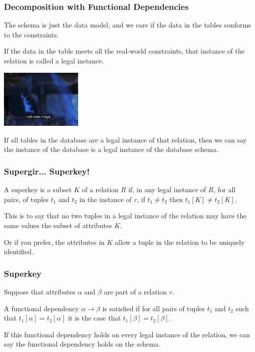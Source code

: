 \begin{frame}
\frametitle{Decomposition with Functional Dependencies}

The schema is just the data model, and we care if the data in the tables conforms to the constraints. 

If the data in the table meets all the real-world constraints, that instance of the relation is called a \alert{legal instance}. 

\begin{center}
	\includegraphics[width=0.3\textwidth]{images/makeitlegal.png}
\end{center}

If all tables in the database are a legal instance of that relation, then we can say the instance of the database is a legal instance of the database schema.

\end{frame}



\begin{frame}
\frametitle{Supergir... Superkey!}

A \alert{superkey} is a subset $K$ of a relation $R$ if, in any legal instance of $R$, for all pairs, of tuples $t_{1}$ and $t_{2}$ in the instance of $r$, if $t_{1} \neq t_{2}$ then $t_{1}[K] \neq t_{2}[K]$. 

This is to say that no two tuples in a legal instance of the relation may have the same values the subset of attributes $K$.

Or if you prefer, the attributes in $K$ allow a tuple in the relation to be uniquely identified.

\end{frame}


\begin{frame}
\frametitle{Superkey}

Suppose that attributes $\alpha$ and $\beta$ are part of a relation $r$. 

A functional dependency $\alpha \rightarrow \beta$ is satisfied if for all pairs of tuples $t_{1}$ and $t_{2}$ such that $t_{1}[\alpha] = t_{2}[\alpha]$ it is the case that $t_{1}[\beta] = t_{2}[\beta]$. 

If this functional dependency holds on every legal instance of the relation, we can say the functional dependency holds on the schema.

\end{frame}



